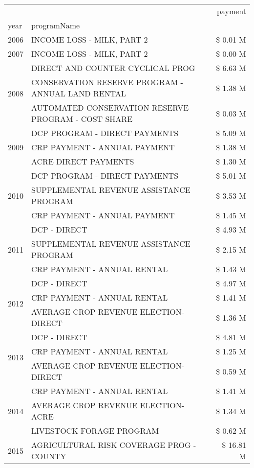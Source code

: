 \begin{tabular}{llr}
\toprule
 &  & payment \\
year & programName &  \\
\midrule
2006 & INCOME LOSS - MILK, PART 2 & \$ 0.01 M \\
\cline{1-3}
2007 & INCOME LOSS - MILK, PART 2 & \$ 0.00 M \\
\cline{1-3}
\multirow[t]{3}{*}{2008} & DIRECT AND COUNTER CYCLICAL PROG & \$ 6.63 M \\
 & CONSERVATION RESERVE PROGRAM - ANNUAL LAND RENTAL & \$ 1.38 M \\
 & AUTOMATED CONSERVATION RESERVE PROGRAM - COST SHARE & \$ 0.03 M \\
\cline{1-3}
\multirow[t]{3}{*}{2009} & DCP PROGRAM - DIRECT PAYMENTS & \$ 5.09 M \\
 & CRP PAYMENT - ANNUAL PAYMENT & \$ 1.38 M \\
 & ACRE DIRECT PAYMENTS & \$ 1.30 M \\
\cline{1-3}
\multirow[t]{3}{*}{2010} & DCP PROGRAM - DIRECT PAYMENTS & \$ 5.01 M \\
 & SUPPLEMENTAL REVENUE ASSISTANCE PROGRAM & \$ 3.53 M \\
 & CRP PAYMENT - ANNUAL PAYMENT & \$ 1.45 M \\
\cline{1-3}
\multirow[t]{3}{*}{2011} & DCP - DIRECT & \$ 4.93 M \\
 & SUPPLEMENTAL REVENUE ASSISTANCE PROGRAM & \$ 2.15 M \\
 & CRP PAYMENT - ANNUAL RENTAL & \$ 1.43 M \\
\cline{1-3}
\multirow[t]{3}{*}{2012} & DCP - DIRECT & \$ 4.97 M \\
 & CRP PAYMENT - ANNUAL RENTAL & \$ 1.41 M \\
 & AVERAGE CROP REVENUE ELECTION-DIRECT & \$ 1.36 M \\
\cline{1-3}
\multirow[t]{3}{*}{2013} & DCP - DIRECT & \$ 4.81 M \\
 & CRP PAYMENT - ANNUAL RENTAL & \$ 1.25 M \\
 & AVERAGE CROP REVENUE ELECTION-DIRECT & \$ 0.59 M \\
\cline{1-3}
\multirow[t]{3}{*}{2014} & CRP PAYMENT - ANNUAL RENTAL & \$ 1.41 M \\
 & AVERAGE CROP REVENUE ELECTION-ACRE & \$ 1.34 M \\
 & LIVESTOCK FORAGE PROGRAM & \$ 0.62 M \\
\cline{1-3}
\multirow[t]{3}{*}{2015} & AGRICULTURAL RISK COVERAGE PROG - COUNTY & \$ 16.81 M \\

\end{tabular}
